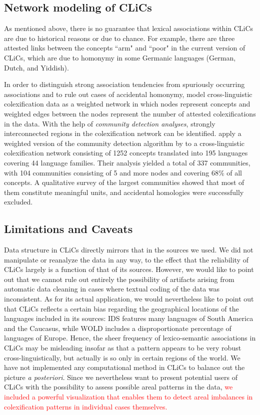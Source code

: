 \subsection{Network modeling of CLiCs}
As mentioned above, there is no guarantee that lexical associations within CLiCs are due to
historical reasons or due to chance. For example, there are three attested links between the
concepts ``arm" and ``poor" in the current version of CLiCs, which are due to homonymy in some
Germanic languages (German, Dutch, and Yiddish).
 
In order to distinguish strong
association tendencies from
spuriously occurring associations and to rule out cases of accidental homonymy,  model cross-linguistic colexification data as a weighted network
in which nodes represent concepts and weighted edges between the nodes represent the number of
attested colexifications in the data.  With the help of \emph{community detection analyses}, strongly
interconnected regions in the colexification network can be identified.  apply
a weighted version of the community detection algorithm by  to a
cross-linguistic colexification network consisting of 1252 concepts translated into 195 languages
covering 44 language families. Their analysis yielded a total of 337 communities, with 104 communities
consisting of 5 and more nodes and covering 68\% of all concepts. A qualitative survey of the
largest communities showed that most of them constitute meaningful units, and accidental homologies
were successfully excluded.
\subsection{Limitations and Caveats} \label{caveats}

Data structure in CLiCs directly mirrors that in the sources we used. We did not manipulate or
reanalyze the data in any way, to the effect that the reliability of CLiCs largely is a function of
that of its sources. However, we would like to point out that we cannot rule out entirely the
possibility of artifacts arising from automatic data cleaning in cases where textual coding of the
data was inconsistent. As for its actual application, we would nevertheless like to point out that
CLiCs reflects a certain bias regarding the geographical locations of the languages included in its
sources: IDS features many languages of South America and the Caucasus, while WOLD includes a
disproportionate percentage of languages of Europe. Hence, the sheer frequency of lexico-semantic
associations in CLiCs may be misleading insofar as that  a pattern appears to be very robust
cross-linguistically, but actually is so only in certain regions of the world. We have not
implemented any computational method in CLiCs to balance out the picture \emph{a posteriori}. Since we
nevertheless want to present potential users of CLiCs with the possibility to assess possible areal
patterns in the data, \textcolor{red}{we included a powerful visualization that enables them to detect areal
imbalances in colexification patterns in individual cases themselves.}



